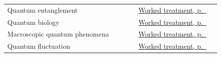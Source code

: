 \documentclass[11pt,oneside]{book}
\begin{document}
\begin{longtable}{p{0.57\linewidth}p{0.35\linewidth}}
\label{index:quantum-entanglement}Quantum entanglement & \hyperref[topic:quantum-entanglement]{Worked treatment, p.~\pageref*{topic:quantum-entanglement}} \\
\label{index:quantum-biology}Quantum biology & \hyperref[topic:quantum-biology]{Worked treatment, p.~\pageref*{topic:quantum-biology}} \\
\label{index:macroscopic-quantum-phenomena}Macroscopic quantum phenomena & \hyperref[topic:macroscopic-quantum-phenomena]{Worked treatment, p.~\pageref*{topic:macroscopic-quantum-phenomena}} \\
\label{index:quantum-fluctuation}Quantum fluctuation & \hyperref[topic:quantum-fluctuation]{Worked treatment, p.~\pageref*{topic:quantum-fluctuation}} \\
\bottomrule
\end{longtable}
\end{document}
